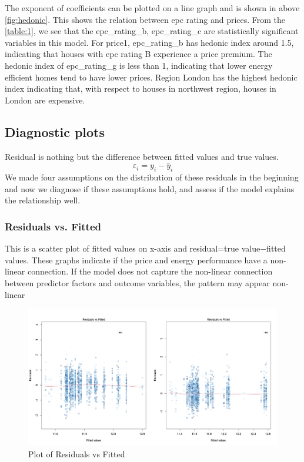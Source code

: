 \documentclass[12pt]{article}
\begin{document}
The exponent of coefficients can be plotted on a line graph and is shown in above \autoref{fig:hedonic}. This shows the relation between  \acrshort{epc} rating and prices. From the \autoref{table:1}, we see that the epc\_rating\_b, epc\_rating\_c are statistically significant variables in this model. For \gls{price1}, epc\_rating\_b has hedonic index around 1.5, indicating that houses with \acrshort{epc} rating B experience a price premium. The hedonic index of epc\_rating\_g is less than 1, indicating that lower energy efficient homes tend to have lower prices. Region London has the highest hedonic index indicating that, with respect to houses in northwest region, houses in London are expensive.

\subsection{Diagnostic plots}
\label{diag_plot}
Residual is nothing but the difference between fitted values and true values. $$\varepsilon_i=y_i-\hat y_i$$ We made four assumptions on the distribution of these residuals in the beginning and now we diagnose if these assumptions hold, and assess if the model explains the relationship well.
\subsubsection{Residuals vs. Fitted}
This is a scatter plot of fitted values on x-axis and residual=true value$-$fitted values. These graphs indicate if the price and energy performance have a non-linear connection.
If the model does not capture the non-linear connection between predictor factors and outcome variables, the pattern may appear non-linear

\begin{figure}[H]
    \centering
    \includegraphics[width=18cm]{3.3 images/3.3.1plot.png}
    \caption{Plot of Residuals vs Fitted}
    \label{fig:residue}
\end{figure}
\end{document}
